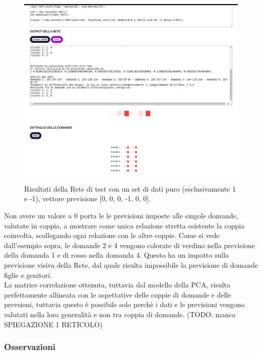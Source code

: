 \begin{figure}[H]
\centering
	\includegraphics[width=1\linewidth]{./image/RetediProva_generatorinputpuro.png}
	\caption{Risultati della Rete di test con un set di dati puro (esclusivamente 1 e -1), vettore previsione [0, 0, 0, -1, 0, 0].}
	\label{Risultati della Rete di test con un set di dati puro (esclusivamente 1 e -1), vettore previsione [0, 0, 0, -1, 0, 0].}
\end{figure}
\noindent

Non avere un valore a 0 porta le le previsioni imposte alle singole domande, valutate in coppia, a mostrare come unica relazione stretta esistente la coppia coinvolta, scollegando ogni relazione con le altre coppie. Come si vede dall'esempio sopra, le domande 2 e 4 vengono colorate di verdino nella previsione della domanda 1 e di rosso nella domanda 4. Questo ha un impatto sulla previsione visiva della Rete, dal quale risulta impossibile la previsione di domande figlie e genitori.\\
La matrice correlazione ottenuta, tuttavia dal modello della PCA, risulta perfettamente allineata con le aspettative delle coppie di domande e delle prevsioni, tuttavia questo \`e possibile solo perch\`e i dati e le previsioni vengono valutati nella loro generalit\`a e non tra coppia di domande. (TODO: manca SPIEGAZIONE 1 RETICOLO)

\subsubsection{Osservazioni}
